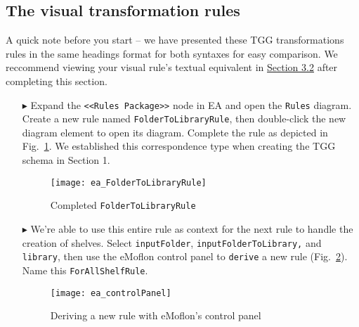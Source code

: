 \newpage
\hypertarget{treeToModel vis}{}
\subsection{The visual transformation rules}
\visHeader

A quick note before you start -- we have presented these TGG transformations rules in the same headings format for both syntaxes for easy comparison. We
reccommend viewing your visual rule's textual equivalent in \hyperlink{treeToModel tex}{Section 3.2} after completing this section.

\begin{itemize}

\subsubsection{FolderToLibraryRule} %

\item[$\blacktriangleright$] Expand the \texttt{<<Rules Package>>} node in EA and open the \texttt{Rules} diagram. Create a new rule named
\texttt{FolderToLibraryRule}, then double-click the new diagram element to open its diagram. Complete the rule as depicted in
Fig.~\ref{ea:FolderIntoLibrary_Complete}. We established this correspondence type when creating the TGG schema in Section 1.

\vspace{0.5cm}

\begin{figure}[htbp]
\begin{center}
  \texttt{[image: ea\_FolderToLibraryRule]}
  \caption{Completed \texttt{FolderToLibraryRule}}
  \label{ea:FolderIntoLibrary_Complete}
\end{center}
\end{figure}

\item[$\blacktriangleright$] We're able to use this entire rule as context for the next rule to handle the creation of shelves. Select
\texttt{inputFolder}, \texttt{in\-put\-Fol\-der\-To\-Lib\-rary,} and \texttt{library}, then use the eMoflon control panel to \texttt{derive} a new rule
(Fig.~\ref{ea:controlPanel}).
Name this \texttt{ForAllShelfRule}.

\vspace{0.5cm}

\begin{figure}[htbp]
\begin{center}
  \texttt{[image: ea\_controlPanel]}
  \caption{Deriving a new rule with eMoflon's control panel}
  \label{ea:controlPanel}
\end{center}
\end{figure}


\end{itemize}

